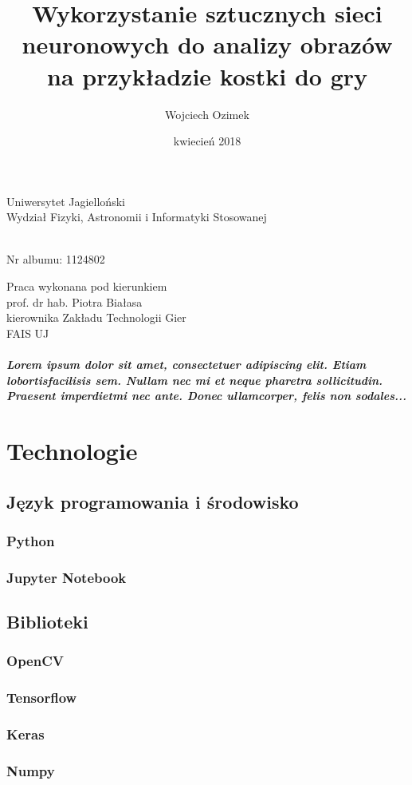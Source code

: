 \documentclass[a4paper,oneside,12pt]{report}
\author{Wojciech Ozimek}
\title{Wykorzystanie sztucznych sieci neuronowych do analizy obrazów na przykładzie kostki do gry}
\date{kwiecień 2018}
\makeatletter
\renewcommand{\maketitle}{\begin{titlepage}

	\vspace*{ \stretch{1} }
	\begin{center} \LARGE
	Uniwersytet Jagielloński \\
  	Wydział Fizyki, Astronomii i Informatyki Stosowanej
	\end{center}

	\vspace{ \stretch{1} }
	\begin{center} \Huge
		\textsc {\@title}
	\end{center}

	\vspace{ \stretch{1} }
	\begin{center}
		\large \@author \\
		\vspace{3mm}
		\normalsize Nr albumu: 1124802
	\end{center}

	\vspace{ \stretch{1.5} }
	\begin{flushright}
	\begin{minipage}{8cm}
	\begin{center} \large
	Praca wykonana pod kierunkiem \\
	prof. dr hab. Piotra Białasa \\
	kierownika Zakładu Technologii Gier \\
	FAIS UJ
	\end{center}
	\end{minipage}
	\end{flushright}
	\vspace{ \stretch{1} }
	\begin{center}
	\@date
	\end{center}
\end{titlepage}
}
\makeatother
\begin{document}
\maketitle{}

\tableofcontents
\newpage




\paragraph {Lorem  ipsum  dolor  sit  amet,  consectetuer  adipiscing
elit.   Etiam  lobortisfacilisis sem.  Nullam nec mi et
neque pharetra sollicitudin.  Praesent imperdietmi nec ante.
Donec ullamcorper, felis non sodales...}


\chapter {Technologie}

\section {Język programowania i środowisko}

\subsection {Python}

\subsection {Jupyter Notebook}

\section {Biblioteki}

\subsection {OpenCV}

\subsection {Tensorflow}

\subsection {Keras}

\subsection {Numpy}
\end{document}
